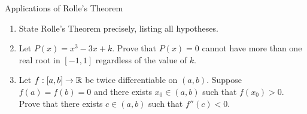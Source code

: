 \begin{exercise}{Applications of Rolle's Theorem}
\begin{enumerate}[leftmargin=1.5em,itemsep=2pt]
  \item State Rolle's Theorem precisely, listing all hypotheses.
  \item Let $P(x) = x^3 - 3x + k$. Prove that $P(x) = 0$ cannot have more than one real root in $[-1, 1]$ regardless of the value of $k$.
  \item Let $f: [a, b] \to \mathbb{R}$ be twice differentiable on $(a, b)$.
  Suppose $f(a) = f(b) = 0$ and there exists $x_0 \in (a, b)$ such that $f(x_0) > 0$.
  Prove that there exists $c \in (a, b)$ such that $f''(c) < 0$.
\end{enumerate}
\end{exercise}

\begin{tabletworkspace}[5.0cm]
\end{tabletworkspace}

